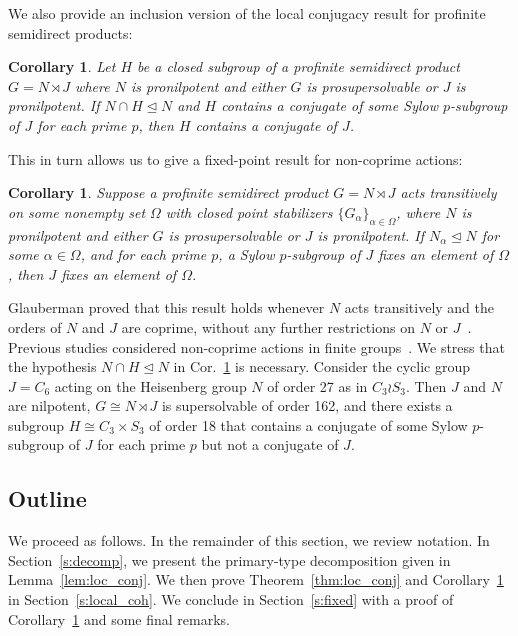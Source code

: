 \documentclass{amsart}
\newtheorem{corollary}[theorem]{Corollary}
\theoremstyle{definition}
\theoremstyle{remark}
\numberwithin{equation}{section}
\newcommand{\iso}{\cong}
\newcommand{\semi}{\rtimes}
\newcommand{\normal}{\trianglelefteq}
\begin{document}
We also provide an inclusion version of the local conjugacy result for profinite semidirect products:

\begin{corollary}
	\label{thm:loc_inclusion}
	Let $H$ be a closed subgroup of a profinite semidirect product $G=N \semi J$ where $N$ is pronilpotent and either $G$ is prosupersolvable or $J$ is pronilpotent. If $N\cap H \normal N$ and $H$ contains a conjugate of some Sylow $p$-subgroup of $J$ for each prime $p$, then $H$ contains a conjugate of $J$.
\end{corollary}

This in turn allows us to give a fixed-point result for non-coprime actions:
\begin{corollary}
	\label{cor:fix_pt}
	Suppose a profinite semidirect product $G=N \semi J$ acts transitively on some nonempty set $\Omega$ with closed point stabilizers $\{G_\alpha\}_{\alpha\in\Omega}$, where $N$ is pronilpotent and either $G$ is prosupersolvable or $J$ is pronilpotent. If $N_\alpha \normal N$ for some $\alpha\in\Omega$, and for each prime $p$, a Sylow $p$-subgroup of $J$ fixes an element of $\Omega$, then $J$ fixes an element of $\Omega$.
\end{corollary}

Glauberman proved that this result holds whenever $N$ acts transitively and the orders of $N$ and $J$ are coprime, without any further restrictions on $N$ or $J$~\cite[Thm.~4]{Gla64}. Previous studies considered non-coprime actions in finite groups~\cite{Bur25a,Bur25b}. We stress that the hypothesis $N\cap H \normal N$ in Cor.~\ref{thm:loc_inclusion} is necessary. Consider the cyclic group $J=C_6$ acting on the Heisenberg group $N$ of order 27 as in $C_3\wr S_3$. Then $J$ and $N$ are nilpotent, $G\iso N \semi J$ is supersolvable of order 162, and there exists a subgroup $H\iso C_3\times S_3$ of order 18 that contains a conjugate of some Sylow $p$-subgroup of $J$ for each prime $p$ but not a conjugate of $J$.

\subsection{Outline}
We proceed as follows. In the remainder of this section, we review notation. In Section~\ref{s:decomp}, we present the primary-type decomposition given in Lemma~\ref{lem:loc_conj}. We then prove Theorem~\ref{thm:loc_conj} and Corollary~\ref{thm:loc_inclusion} in Section~\ref{s:local_coh}. We conclude in Section~\ref{s:fixed} with a proof of Corollary~\ref{cor:fix_pt} and some final remarks.
\end{document}
